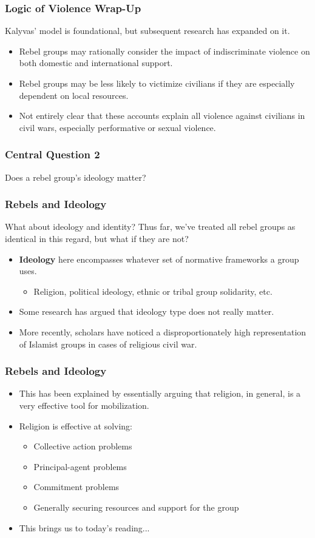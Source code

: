 \documentclass{beamer}
\begin{document}
\begin{frame} 
	\frametitle{\LARGE{Logic of Violence Wrap-Up}}
Kalyvas' model is foundational, but subsequent research has expanded on it.
	\begin{itemize}
		\item Rebel groups may rationally consider the impact of indiscriminate violence on both domestic and international support. \pause
		\item Rebel groups may be less likely to victimize civilians if they are especially dependent on local resources. \pause
		\item Not entirely clear that these accounts explain all violence against civilians in civil wars, especially performative or sexual violence.
	\end{itemize}
\end{frame}

\begin{frame} 
	\frametitle{\LARGE{Central Question 2}}
	\centering
	\Large{Does a rebel group's ideology matter?} 
\end{frame}

\begin{frame} 
	\frametitle{\LARGE{Rebels and Ideology}}
What about ideology and identity? Thus far, we've treated all rebel groups as identical in this regard, but what if they are not? \pause
	\begin{itemize}
		\item \textbf{Ideology} here encompasses whatever set of normative frameworks a group uses.
		\begin{itemize}
			\item Religion, political ideology, ethnic or tribal group solidarity, etc. \pause
		\end{itemize}
		\item Some research has argued that ideology type does not really matter. \pause
		\item More recently, scholars have noticed a disproportionately high representation of Islamist groups in cases of religious civil war. \pause
	\end{itemize}
\end{frame}

\begin{frame} 
	\frametitle{\LARGE{Rebels and Ideology}}
	\begin{itemize}
		\item This has been explained by essentially arguing that religion, in general, is a very effective tool for mobilization.\pause
		\item Religion is effective at solving: \pause
		\begin{itemize}
			\item Collective action problems \pause
			\item Principal-agent problems \pause
			\item Commitment problems \pause
			\item Generally securing resources and support for the group \pause
		\end{itemize}
	\item This brings us to today's reading...
	\end{itemize}
\end{frame}
\end{document}
